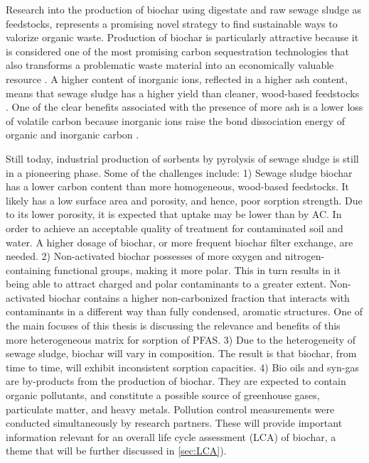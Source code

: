 Research into the production of biochar using digestate and raw sewage sludge as feedstocks, represents a promising novel strategy to find sustainable ways to valorize organic waste. Production of biochar is particularly attractive because it is considered one of the most promising carbon sequestration technologies that also transforms a problematic waste material into an economically valuable resource \citep{arvaniti2014sorption}. A higher content of inorganic ions, reflected in a higher ash content, means that sewage sludge has a higher yield than cleaner, wood-based feedstocks \citep{Cantrell2012}. One of the clear benefits associated with the presence of more ash is a lower loss of volatile carbon because inorganic ions raise the bond dissociation energy of organic and inorganic carbon \citep{Cantrell2012,Enders2012}. 

Still today, industrial production of sorbents by pyrolysis of sewage sludge is still in a pioneering phase. Some of the challenges include: 1) Sewage sludge biochar has a lower carbon content than more homogeneous, wood-based feedstocks. It likely has a low surface area and porosity, and hence, poor sorption strength. Due to its lower porosity, it is expected that uptake may be lower than by AC. In order to achieve an acceptable quality of treatment for contaminated soil and water. A higher dosage of biochar, or more frequent biochar filter exchange, are needed. 2) Non-activated biochar possesses of more oxygen and nitrogen-containing functional groups, making it more polar. This in turn results in it being able to attract charged and polar contaminants to a greater extent. Non-activated biochar contains a higher non-carbonized fraction that interacts with contaminants in a different way than fully condensed, aromatic structures. One of the main focuses of this thesis is discussing the relevance and benefits of this more heterogeneous matrix for sorption of PFAS. 3) Due to the heterogeneity of sewage sludge, biochar will vary in composition. The result is that biochar, from time to time, will exhibit inconsistent sorption capacities. 4) Bio oils and syn-gas are by-products from the production of biochar. They are expected to contain organic pollutants, and constitute a possible source of greenhouse gases, particulate matter, and heavy metals. Pollution control measurements were conducted simultaneously by research partners. These will provide important information relevant for an overall life cycle assessment (\acrshort{LCA}) of biochar, a theme that will be further discussed in \cref{sec:LCA}). 

